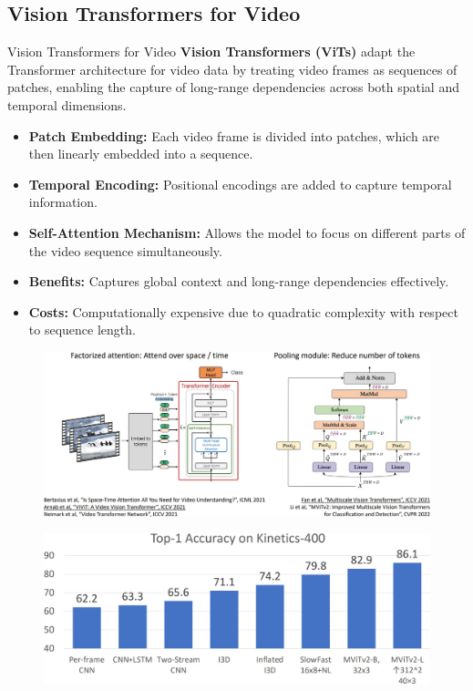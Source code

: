 \subsection{Vision Transformers for Video}
\begin{frame}[allowframebreaks]{Vision Transformers for Video}
    \textbf{Vision Transformers (ViTs)} adapt the Transformer architecture for video data by treating video frames as sequences of patches, enabling the capture of long-range dependencies across both spatial and temporal dimensions.

    \begin{itemize}
        \item \textbf{Patch Embedding:} Each video frame is divided into patches, which are then linearly embedded into a sequence.
        \item \textbf{Temporal Encoding:} Positional encodings are added to capture temporal information.
        \item \textbf{Self-Attention Mechanism:} Allows the model to focus on different parts of the video sequence simultaneously.
        \item \textbf{Benefits:} Captures global context and long-range dependencies effectively.
        \item \textbf{Costs:} Computationally expensive due to quadratic complexity with respect to sequence length.
    \end{itemize}
\framebreak
    \begin{figure}
        \centering
        \includegraphics[width=1\textwidth,height=0.9\textheight,keepaspectratio]{images/video/slide_38_1_img.jpg}
    \end{figure}
\framebreak
    \begin{figure}
        \centering
        \includegraphics[width=1\textwidth,height=0.9\textheight,keepaspectratio]{images/video/slide_39_1_img.jpg}
    \end{figure}
\end{frame}